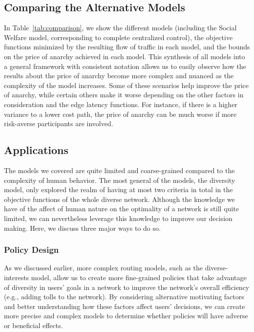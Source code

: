 
\subsection{Comparing the Alternative Models}
In Table~\ref{tab:comparison}, we show the different models (including the Social Welfare model, corresponding to complete centralized control), the objective functions minimized 
by the resulting flow of traffic in each model, and the bounds on the price of anarchy achieved in each model. This synthesis of all models into a general framework with consistent notation allows us to easily observe how the results about the price of anarchy become more complex and nuanced as the complexity of the model increases. Some of these scenarios help improve the price of anarchy, while certain others make it worse depending on the other factors in
consideration and the edge latency functions. For instance, if there is a higher variance to a lower cost path, the price of anarchy can be much worse if more risk-averse participants are involved.

\subsection{Applications}
The models we covered are quite limited and coarse-grained compared to the complexity of human behavior. The most general of the models, the diversity model, only explored the realm of having at most two criteria in total in the objective functions of the whole diverse network.
Although the knowledge we have of the affect of human nature on the optimality of a network is still quite limited, we can nevertheless leverage this knowledge to improve our decision making. Here, we discuss three major ways to do so.

\subsubsection{Policy Design}
As we discussed earlier, more complex routing models, such as the diverse-interests model, allow us to create more fine-grained policies that take advantage of diversity in users' goals in a network to improve the network's overall efficiency (e.g., adding tolls to the network).
By considering alternative motivating factors and better understanding how these factors affect users' decisions, we can create more precise and complex models to determine whether policies will have adverse or beneficial effects.

